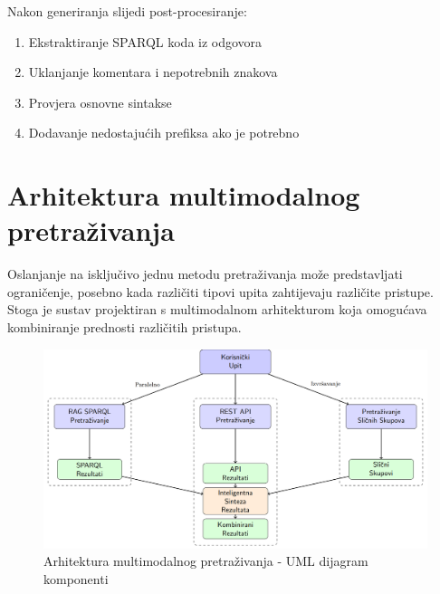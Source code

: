 Nakon generiranja slijedi post-procesiranje:

\begin{enumerate}
    \item Ekstraktiranje SPARQL koda iz odgovora
    \item Uklanjanje komentara i nepotrebnih znakova
    \item Provjera osnovne sintakse
    \item Dodavanje nedostajućih prefiksa ako je potrebno
\end{enumerate}

\section{Arhitektura multimodalnog pretraživanja}

Oslanjanje na isključivo jednu metodu pretraživanja može predstavljati ograničenje, posebno kada različiti tipovi upita zahtijevaju različite pristupe. Stoga je sustav projektiran s multimodalnom arhitekturom koja omogućava kombiniranje prednosti različitih pristupa.

\begin{figure}[htbp]
    \centering
    \includegraphics[width=1\textwidth]{figures/multimodal_search.png}
    \caption{Arhitektura multimodalnog pretraživanja - UML dijagram komponenti}
    \label{fig:multimodal_architecture_uml}
\end{figure} 
